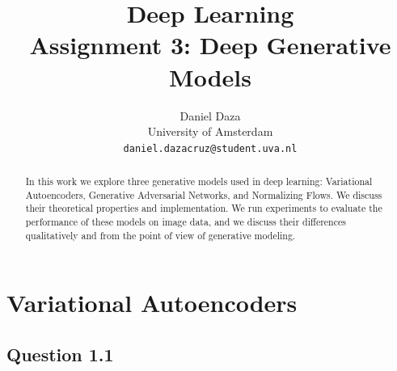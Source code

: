 \documentclass{article}
\title{Deep Learning\\Assignment 3: Deep Generative Models}
\author{%
  Daniel Daza\\
  University of Amsterdam\\
  \texttt{daniel.dazacruz@student.uva.nl} \\
}
\begin{document}

\maketitle

\begin{abstract}
In this work we explore three generative models used in deep learning: Variational Autoencoders, Generative Adversarial Networks, and Normalizing Flows. We discuss their theoretical properties and implementation. We run experiments to evaluate the performance of these models on image data, and we discuss their differences qualitatively and from the point of view of generative modeling.
\end{abstract}


\section{Variational Autoencoders}

\subsection*{Question 1.1}
\end{document}

